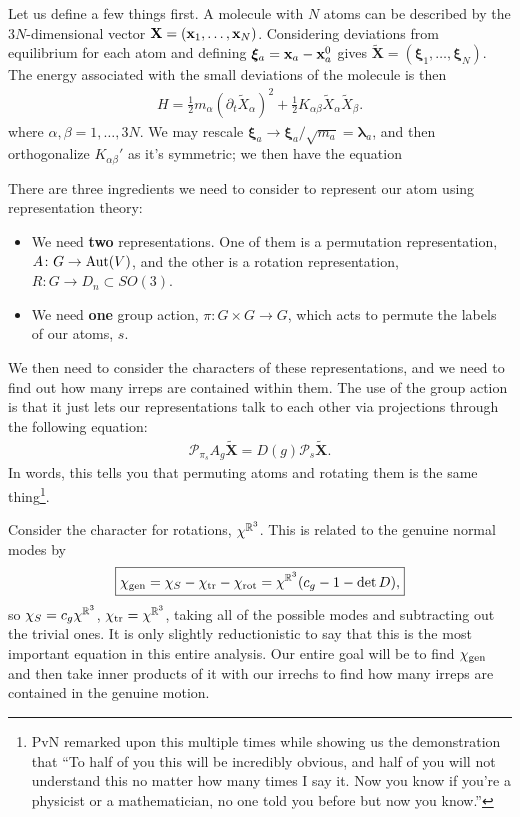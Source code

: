 \documentclass[11pt]{article}
\begin{document}
Let us define a few things first. A molecule with $N$ atoms
can be described by the $3N$-dimensional vector $\mathbf{X} = (\mathbf{x}_1, \ldots, \mathbf{x}_N)$.
Considering deviations from equilibrium for each atom
and defining $\boldsymbol{\xi}_a = \mathbf{x}_a - \mathbf{x}_a^0$
gives $\widetilde{\mathbf{X}} = (\boldsymbol{\xi}_1, \ldots, \boldsymbol{\xi}_N)$.
The energy associated with the small deviations of the molecule is
then
\begin{align*}
    H = \frac{1}{2}m_\alpha (\partial_t \widetilde{X}_\alpha)^2 + \frac{1}{2}K_{\alpha \beta} \widetilde{X}_\alpha \widetilde{X}_\beta.
\end{align*}
where $\alpha, \beta = 1, \ldots, 3N$. We may rescale 
$\boldsymbol{\xi}_a \to \boldsymbol{\xi}_a/\sqrt{m_a} = \boldsymbol{\lambda}_a$,
and then orthogonalize $K_{\alpha \beta}'$ as it's symmetric;
we then have the equation 


There are three ingredients we need to consider
to represent our atom using representation theory:
\begin{itemize}
    \item We need \textbf{two} representations. One of them
    is a permutation representation, $A \colon G \to \operatorname{Aut}(V)$,
    and the other is a rotation representation, $R \colon G \to D_n \subset SO(3)$.
    \item We need \textbf{one} group action, $\pi \colon G \times G \to G$,
    which acts to permute the labels of our atoms, $s$.
\end{itemize}

We then need to consider the characters of these representations,
and we need to find out how many irreps are contained within them.
The use of the group action is that it just lets our representations 
talk to each other via projections through the following equation:
\begin{align*}
    \boxed{\mathcal{P}_{\pi_s} A_g \widetilde{\mathbf{X}} = D(g) \mathcal{P}_s \widetilde{\mathbf{X}}.}
\end{align*}
In words, this tells you that permuting atoms and rotating them
is the same thing\footnote{PvN remarked upon this multiple times
while showing us the demonstration that ``To half of you this will
be incredibly obvious, and half of you will not understand
this no matter how many times I say it. Now you know if you're
a physicist or a mathematician, no one told you before but now you know.''
}.

Consider the character for rotations, $\chi^{\mathbb{R}^3}$. This is related
to the genuine normal modes by
\begin{align*}
    \boxed{\chi_{\rm gen} = \chi_S - \chi_{\rm tr} - \chi_{\rm rot} = \chi^{\mathbb{R}^3} (c_g - 1 - \operatorname{det}{D}),}
\end{align*}
so $\chi_S = c_g \chi^{\mathbb{R}^3}$, $\chi_{\rm tr} = \chi^{\mathbb{R}^3}$,
taking all of the possible modes and subtracting out the trivial ones.
It is only slightly reductionistic to say that this is the most important equation
in this entire analysis. Our entire goal will be to find $\chi_{\rm gen}$
and then take inner products of it with our irrechs to find how many irreps
are contained in the genuine motion.

\end{document}
